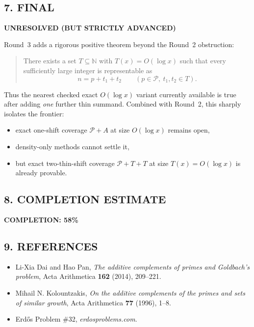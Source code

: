 \subsection{7. FINAL}

\textbf{UNRESOLVED (BUT STRICTLY ADVANCED)}

Round~3 adds a rigorous positive theorem beyond the Round~2 obstruction:

\begin{quote}
There exists a set $T\subseteq\mathbb N$ with $T(x)=O(\log x)$ such that every sufficiently large integer is representable as
\[
 n=p+t_1+t_2
 \qquad (p\in\mathcal P,\ t_1,t_2\in T).
\]
\end{quote}

Thus the nearest checked exact $O(\log x)$ variant currently available is true after adding \emph{one} further thin summand.  Combined with Round~2, this sharply isolates the frontier:

\begin{itemize}
\item exact one-shift coverage $\mathcal P+A$ at size $O(\log x)$ remains open,
\item density-only methods cannot settle it,
\item but exact two-thin-shift coverage $\mathcal P+T+T$ at size $T(x)=O(\log x)$ is already provable.
\end{itemize}

\subsection{8. COMPLETION ESTIMATE}

\textbf{COMPLETION: 58\%}

\subsection{9. REFERENCES}

\begin{itemize}
\item[{[DP14]}] Li-Xia Dai and Hao Pan, \emph{The additive complements of primes and Goldbach's problem}, Acta Arithmetica \textbf{162} (2014), 209--221.
\item[{[Ko96]}] Mihail N. Kolountzakis, \emph{On the additive complements of the primes and sets of similar growth}, Acta Arithmetica \textbf{77} (1996), 1--8.
\item[{[EP32]}] Erd\H{o}s Problem \#32, \emph{erdosproblems.com}.
\end{itemize}
